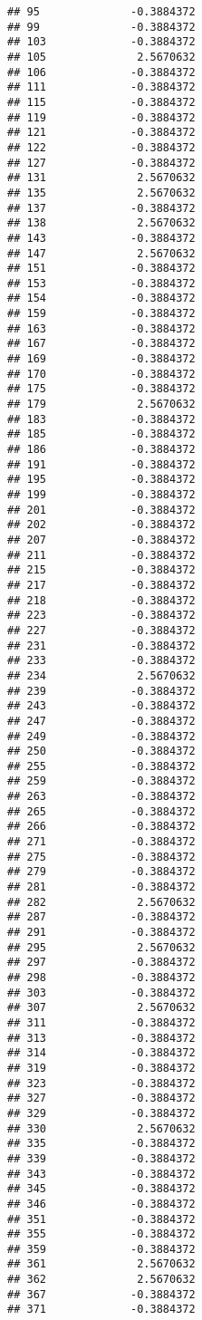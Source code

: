 \documentclass[
]{article}
\begin{document}
\begin{verbatim}
## 95              -0.3884372
## 99              -0.3884372
## 103             -0.3884372
## 105              2.5670632
## 106             -0.3884372
## 111             -0.3884372
## 115             -0.3884372
## 119             -0.3884372
## 121             -0.3884372
## 122             -0.3884372
## 127             -0.3884372
## 131              2.5670632
## 135              2.5670632
## 137             -0.3884372
## 138              2.5670632
## 143             -0.3884372
## 147              2.5670632
## 151             -0.3884372
## 153             -0.3884372
## 154             -0.3884372
## 159             -0.3884372
## 163             -0.3884372
## 167             -0.3884372
## 169             -0.3884372
## 170             -0.3884372
## 175             -0.3884372
## 179              2.5670632
## 183             -0.3884372
## 185             -0.3884372
## 186             -0.3884372
## 191             -0.3884372
## 195             -0.3884372
## 199             -0.3884372
## 201             -0.3884372
## 202             -0.3884372
## 207             -0.3884372
## 211             -0.3884372
## 215             -0.3884372
## 217             -0.3884372
## 218             -0.3884372
## 223             -0.3884372
## 227             -0.3884372
## 231             -0.3884372
## 233             -0.3884372
## 234              2.5670632
## 239             -0.3884372
## 243             -0.3884372
## 247             -0.3884372
## 249             -0.3884372
## 250             -0.3884372
## 255             -0.3884372
## 259             -0.3884372
## 263             -0.3884372
## 265             -0.3884372
## 266             -0.3884372
## 271             -0.3884372
## 275             -0.3884372
## 279             -0.3884372
## 281             -0.3884372
## 282              2.5670632
## 287             -0.3884372
## 291             -0.3884372
## 295              2.5670632
## 297             -0.3884372
## 298             -0.3884372
## 303             -0.3884372
## 307              2.5670632
## 311             -0.3884372
## 313             -0.3884372
## 314             -0.3884372
## 319             -0.3884372
## 323             -0.3884372
## 327             -0.3884372
## 329             -0.3884372
## 330              2.5670632
## 335             -0.3884372
## 339             -0.3884372
## 343             -0.3884372
## 345             -0.3884372
## 346             -0.3884372
## 351             -0.3884372
## 355             -0.3884372
## 359             -0.3884372
## 361              2.5670632
## 362              2.5670632
## 367             -0.3884372
## 371             -0.3884372

\end{verbatim}
\end{document}
